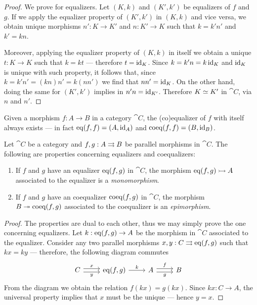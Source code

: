 \begin{proof}
We prove for equalizers. Let \((K, k)\) and \((K', k')\) be equalizers of \(f\)
and \(g\). If we apply the equalizer property of \((K', k')\) in \((K, k)\) and
vice versa, we obtain unique morphisms \(n': K \to K'\) and \(n: K' \to K\) such
that \(k = k' n'\) and \(k' = k n\).

Moreover, applying the equalizer property of \((K, k)\) in itself we obtain a
unique \(t: K \to K\) such that \(k = k t\) --- therefore \(t = \operatorname{id}_K\). Since
\(k = k' n = k \operatorname{id}_K\) and \(\operatorname{id}_K\) is unique with such property, it follows
that, since \(k = k' n' = (k n) n' = k (n n')\) we find that \(n n' =
\operatorname{id}_K\). On the other hand, doing the same for \((K', k')\) implies in \(n' n =
\operatorname{id}_{K'}\). Therefore \(K \simeq K'\) in \(\cat C\), via \(n\) and \(n'\).
\end{proof}

\begin{corollary}
\label{cor:self-(co)equalizer}
Given a morphism \(f: A \to B\) in a category \(\cat C\), the (co)equalizer of
\(f\) with itself always exists --- in fact \(\operatorname{eq}(f, f) = (A, \operatorname{id}_A)\) and
\(\operatorname{coeq}(f, f) = (B, \operatorname{id}_{B})\).
\end{corollary}

\begin{proposition}
\label{prop:eq-monic-coeq-epic}
Let \(\cat C\) be a category and \(f, g: A \rightrightarrows B\) be parallel morphisms in
\(\cat C\). The following are properties concerning equalizers and coequalizers:
\begin{enumerate}\setlength\itemsep{0em}
\item If \(f\) and \(g\) have an equalizer \(\operatorname{eq}(f, g)\) in \(\cat C\), the
  morphism \(\operatorname{eq}(f, g) \rightarrowtail A\) associated to the equalizer is a
  \emph{monomorphism}.

\item If \(f\) and \(g\) have an coequalizer \(\operatorname{coeq}(f, g)\) in \(\cat C\), the
  morphism \(B \twoheadrightarrow \operatorname{coeq}(f, g)\) associated to the coequalizer is an
  \emph{epimorphism}.
\end{enumerate}
\end{proposition}

\begin{proof}
The properties are dual to each other, thus we may simply prove the one
concerning equalizers. Let \(k: \operatorname{eq}(f, g) \to A\) be the morphism in \(\cat C\)
associated to the equalizer. Consider any two parallel morphisms \(x, y: C \rightrightarrows
\operatorname{eq}(f, g)\) such that \(k x = k y\) --- therefore, the following diagram
commutes
\[
\begin{tikzcd}
C \ar[r, shift left, "x"] \ar[r, shift right, "y"']
& \Eq(f, g) \ar[r, "k"]
& A \ar[r, shift left, "f"] \ar[r, shift right, "g"']
& B
\end{tikzcd}
\]
From the diagram we obtain the relation \(f (k x) = g (k x)\). Since \(k x: C
\to A\), the universal property implies that \(x\) must be the unique --- hence
\(y = x\).
\end{proof}

